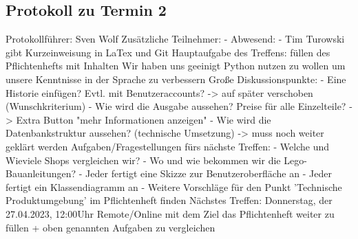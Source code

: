 \subsection{Protokoll zu Termin 2}
Protokollführer: Sven Wolf \newline
Zusätzliche Teilnehmer: - \newline
Abwesend: - \newline \newline
Tim Turowski gibt Kurzeinweisung in LaTex und Git \newline
Hauptaufgabe des Treffens: füllen des Pflichtenhefts mit Inhalten \newline
Wir haben uns geeinigt Python nutzen zu wollen um unsere Kenntnisse in der Sprache zu verbessern \newline
Große Diskussionspunkte: \newline
- Eine Historie einfügen? Evtl. mit Benutzeraccounts? -> auf später verschoben (Wunschkriterium) \newline
- Wie wird die Ausgabe aussehen? Preise für alle Einzelteile? -> Extra Button "mehr Informationen anzeigen" \newline
- Wie wird die Datenbankstruktur aussehen? (technische Umsetzung) -> muss noch weiter geklärt werden \newline
Aufgaben/Fragestellungen fürs nächste Treffen: \newline
- Welche und Wieviele Shops vergleichen wir? \newline
- Wo und wie bekommen wir die Lego-Bauanleitungen? \newline
- Jeder fertigt eine Skizze zur Benutzeroberfläche an \newline
- Jeder fertigt ein Klassendiagramm an \newline
- Weitere Vorschläge für den Punkt 'Technische Produktumgebung' im Pflichtenheft finden \newline
Nächstes Treffen: Donnerstag, der 27.04.2023, 12:00Uhr Remote/Online mit dem Ziel das Pflichtenheft weiter zu füllen + oben genannten Aufgaben zu vergleichen

